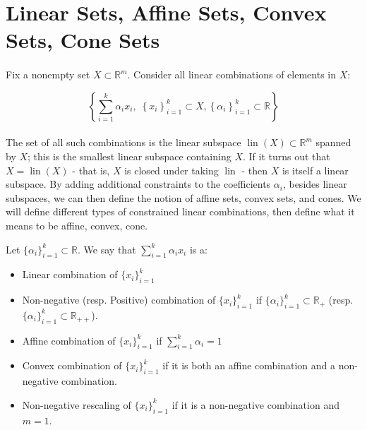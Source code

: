 \section{Linear Sets, Affine Sets, Convex Sets, Cone Sets}
\label{sect:011}

\paragraph{}Fix a nonempty set $X\subset \mathbb{R}^m$. Consider all linear combinations of elements in $X$:

\[
	\left\{\sum_{i=1}^k \alpha_i x_i,\; \left\{ x_i \right\}_{i=1}^k \subset X, \left\{\alpha_i\right\}_{i=1}^k\subset \mathbb{R}\right\}
\]

\paragraph{}The set of all such combinations is the linear subspace $\operatorname{lin}(X)\subset \mathbb{R}^m$ spanned by $X$; this is the smallest linear subspace containing $X$. If it turns out that $X=\operatorname{lin}(X)$ - that is, $X$ is closed under taking $\operatorname{lin}$ - then $X$ is itself a linear subspace. By adding additional constraints to the coefficients $\alpha_i$, besides linear subspaces, we can then define the notion of affine sets, convex sets, and cones. We will define different types of constrained linear combinations, then define what it means to be affine, convex, cone.

\begin{defn}[Combinations]\label{defn:011-comb}
	Let $\{\alpha_i\}_{i=1}^k\subset \mathbb{R}$. We say that $\sum_{i=1}^k \alpha_i x_i$ is a:
	\begin{itemize}
		\item Linear combination of $\{ x_i \}_{i=1}^k$
		\item Non-negative (resp. Positive) combination of $\{ x_i \}_{i=1}^k$ if $\{\alpha_i\}_{i=1}^k\subset \mathbb{R}_+$ (resp. $\{\alpha_i\}_{i=1}^k\subset \mathbb{R}_{++}$).
		\item Affine combination of $\{ x_i \}_{i=1}^k$ if $\sum_{i=1}^k \alpha_i=1$
		\item Convex combination of $\{ x_i \}_{i=1}^k$ if it is both an affine combination and a non-negative combination.
		\item Non-negative rescaling of $\{ x_i \}_{i=1}^k$ if it is a non-negative combination and $m=1$.
	\end{itemize}
\end{defn}

